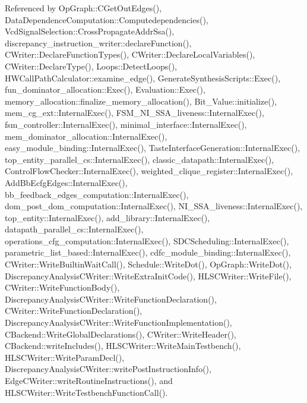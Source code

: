 Referenced by Op\+Graph\+::\+C\+Get\+Out\+Edges(), Data\+Dependence\+Computation\+::\+Computedependencies(), Vcd\+Signal\+Selection\+::\+Cross\+Propagate\+Addr\+Ssa(), discrepancy\+\_\+instruction\+\_\+writer\+::declare\+Function(), C\+Writer\+::\+Declare\+Function\+Types(), C\+Writer\+::\+Declare\+Local\+Variables(), C\+Writer\+::\+Declare\+Type(), Loops\+::\+Detect\+Loops(), H\+W\+Call\+Path\+Calculator\+::examine\+\_\+edge(), Generate\+Synthesis\+Scripts\+::\+Exec(), fun\+\_\+dominator\+\_\+allocation\+::\+Exec(), Evaluation\+::\+Exec(), memory\+\_\+allocation\+::finalize\+\_\+memory\+\_\+allocation(), Bit\+\_\+\+Value\+::initialize(), mem\+\_\+cg\+\_\+ext\+::\+Internal\+Exec(), F\+S\+M\+\_\+\+N\+I\+\_\+\+S\+S\+A\+\_\+liveness\+::\+Internal\+Exec(), fsm\+\_\+controller\+::\+Internal\+Exec(), minimal\+\_\+interface\+::\+Internal\+Exec(), mem\+\_\+dominator\+\_\+allocation\+::\+Internal\+Exec(), easy\+\_\+module\+\_\+binding\+::\+Internal\+Exec(), Taste\+Interface\+Generation\+::\+Internal\+Exec(), top\+\_\+entity\+\_\+parallel\+\_\+cs\+::\+Internal\+Exec(), classic\+\_\+datapath\+::\+Internal\+Exec(), Control\+Flow\+Checker\+::\+Internal\+Exec(), weighted\+\_\+clique\+\_\+register\+::\+Internal\+Exec(), Add\+Bb\+Ecfg\+Edges\+::\+Internal\+Exec(), bb\+\_\+feedback\+\_\+edges\+\_\+computation\+::\+Internal\+Exec(), dom\+\_\+post\+\_\+dom\+\_\+computation\+::\+Internal\+Exec(), N\+I\+\_\+\+S\+S\+A\+\_\+liveness\+::\+Internal\+Exec(), top\+\_\+entity\+::\+Internal\+Exec(), add\+\_\+library\+::\+Internal\+Exec(), datapath\+\_\+parallel\+\_\+cs\+::\+Internal\+Exec(), operations\+\_\+cfg\+\_\+computation\+::\+Internal\+Exec(), S\+D\+C\+Scheduling\+::\+Internal\+Exec(), parametric\+\_\+list\+\_\+based\+::\+Internal\+Exec(), cdfc\+\_\+module\+\_\+binding\+::\+Internal\+Exec(), C\+Writer\+::\+Write\+Builtin\+Wait\+Call(), Schedule\+::\+Write\+Dot(), Op\+Graph\+::\+Write\+Dot(), Discrepancy\+Analysis\+C\+Writer\+::\+Write\+Extra\+Init\+Code(), H\+L\+S\+C\+Writer\+::\+Write\+File(), C\+Writer\+::\+Write\+Function\+Body(), Discrepancy\+Analysis\+C\+Writer\+::\+Write\+Function\+Declaration(), C\+Writer\+::\+Write\+Function\+Declaration(), Discrepancy\+Analysis\+C\+Writer\+::\+Write\+Function\+Implementation(), C\+Backend\+::\+Write\+Global\+Declarations(), C\+Writer\+::\+Write\+Header(), C\+Backend\+::write\+Includes(), H\+L\+S\+C\+Writer\+::\+Write\+Main\+Testbench(), H\+L\+S\+C\+Writer\+::\+Write\+Param\+Decl(), Discrepancy\+Analysis\+C\+Writer\+::write\+Post\+Instruction\+Info(), Edge\+C\+Writer\+::write\+Routine\+Instructions(), and H\+L\+S\+C\+Writer\+::\+Write\+Testbench\+Function\+Call().

